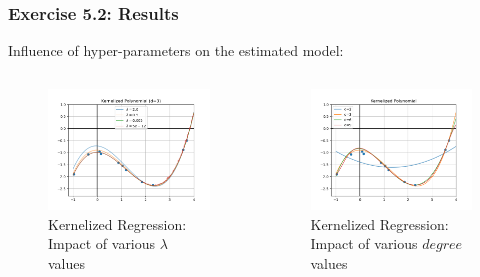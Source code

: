 \documentclass[10pt,aspectratio=169,handout]{beamer}
\begin{document}
\begin{frame}
    \frametitle{Exercise 5.2: Results}

    Influence of hyper-parameters on the estimated model: 
    \begin{columns}
    \begin{column}{0.36\textwidth}
        \begin{figure}
            \centering
            \includegraphics[width=1.1\textwidth]{images/task-5-2-lambda.png}
            \caption{\scriptsize Kernelized Regression:\\Impact of various $\lambda$ values}
        \end{figure}
    \end{column}

    \begin{column}{0.36\textwidth}
        \begin{figure}
            \centering
            \includegraphics[width=1.1\textwidth]{images/task-5-2-degree.png}
            \caption{\scriptsize Kernelized Regression:\\Impact of various $degree$ values}
        \end{figure}
    \end{column}


\end{columns}
\end{frame}
\end{document}
